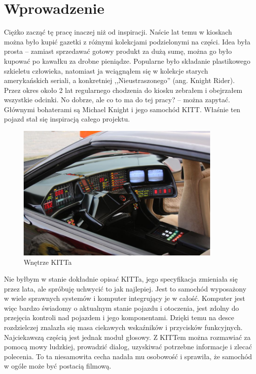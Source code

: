 \documentclass[declaration,shortabstract, inz]{iithesis}
\author         {Michał Postawka}
\begin{document}

\chapter{Wprowadzenie}

Ciężko zacząć tę pracę inaczej niż od inspiracji. Naście lat temu w kioskach można było kupić gazetki z różnymi kolekcjami podzielonymi na części. Idea była prosta -- zamiast sprzedawać gotowy produkt za dużą sumę, można go było kupować po kawałku za drobne pieniądze. Popularne było składanie plastikowego szkieletu człowieka, natomiast ja wciągnąłem się w kolekcje starych amerykańskich seriali, a konkretniej  ,,Nieustraszonego'' (ang. Knight Rider). Przez okres około 2 lat regularnego chodzenia do kiosku zebrałem i obejrzałem wszystkie odcinki.
No dobrze, ale co to ma do tej pracy? -- można zapytać. Głównymi bohaterami są Michael Knight i jego samochód KITT. Właśnie ten pojazd stał się inspiracją całego projektu.

\begin{figure}[htp]
    \centering
    \includegraphics[width=10cm]{images/kitt_interior.jpg}
    \caption{Wnętrze KITTa}
    \label{fig:kitt}
\end{figure}

Nie byłbym w stanie dokładnie opisać KITTa, jego specyfikacja zmieniała się przez lata, ale spróbuję uchwycić to jak najlepiej. Jest to samochód wyposażony w wiele sprawnych systemów i komputer integrujący je w całość. Komputer jest więc bardzo świadomy o aktualnym stanie pojazdu i otoczenia, jest zdolny do przejęcia kontroli nad pojazdem i jego komponentami. Dzięki temu na desce rozdzielczej znalazła się masa ciekawych wskaźników i przycisków funkcyjnych. Najciekawszą częścią jest jednak moduł głosowy. Z KITTem można rozmawiać za pomocą mowy ludzkiej, prowadzić dialog, uzyskiwać potrzebne informacje i zlecać polecenia. To ta niesamowita cecha nadała mu osobowość i sprawiła, że samochód w ogóle może być postacią filmową.
\end{document}
